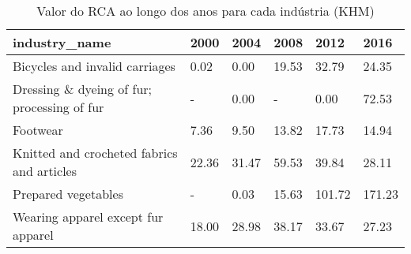 \begin{table}
\centering
\caption{Valor do RCA ao longo dos anos para cada indústria (KHM)}
\begin{tabular}{p{6cm}p{1.5cm}p{1.5cm}p{1.5cm}p{1.5cm}p{1.5cm}}
\toprule
                              industry\_name &  2000 &  2004 &  2008 &   2012 &   2016 \\
\midrule
             Bicycles and invalid carriages &  0.02 &  0.00 & 19.53 &  32.79 &  24.35 \\
Dressing \& dyeing of fur; processing of fur &     - &  0.00 &     - &   0.00 &  72.53 \\
                                   Footwear &  7.36 &  9.50 & 13.82 &  17.73 &  14.94 \\
 Knitted and crocheted fabrics and articles & 22.36 & 31.47 & 59.53 &  39.84 &  28.11 \\
                        Prepared vegetables &     - &  0.03 & 15.63 & 101.72 & 171.23 \\
         Wearing apparel except fur apparel & 18.00 & 28.98 & 38.17 &  33.67 &  27.23 \\
\bottomrule
\end{tabular}
\end{table}
